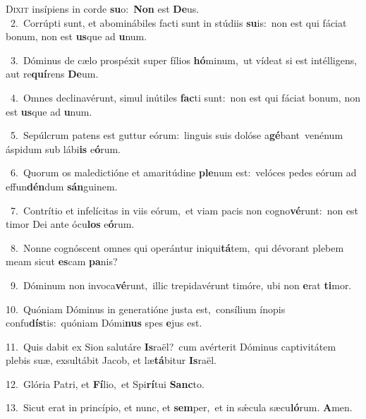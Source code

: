 \lettrine{\initial\textcolor{\initialcolor}{D}}{ixit} insípiens in corde \textbf{su}\-o:~\star \textbf{Non} est \textbf{De}\-us.\\
{\numbfont\textcolor{\numbcolor}{~2.}}~Corrúpti sunt, et abominábiles facti sunt in stúdiis \textbf{su}\-is:~\star non est qui fáciat bonum, non est \textbf{us}\-que ad \textbf{u}\-num.\par
{\numbfont\textcolor{\numbcolor}{~3.}}~Dóminus de cælo prospéxit super fílios \textbf{hó}\-minum,~\star ut vídeat si est intélligens, aut re\-\textbf{quí}\-rens \textbf{De}\-um.\par
{\numbfont\textcolor{\numbcolor}{~4.}}~Omnes declinavérunt, simul inútiles \textbf{fac}\-ti sunt:~\star non est qui fáciat bonum, non est \textbf{us}\-que ad \textbf{u}\-num.\par
{\numbfont\textcolor{\numbcolor}{~5.}}~Sepúlcrum patens est guttur eórum:~\dagger linguis suis dolóse a\-\textbf{gé}\-bant~\star venénum áspidum sub lábi\textbf{is} e\-\textbf{ó}\-rum.\par
{\numbfont\textcolor{\numbcolor}{~6.}}~Quorum os maledictióne et amaritúdine \textbf{ple}\-num est:~\star velóces pedes eórum ad effun\-\textbf{dén}\-dum \textbf{sán}\-guinem.\par
{\numbfont\textcolor{\numbcolor}{~7.}}~Contrítio et infelícitas in viis eórum,~\dagger et viam pacis non cogno\-\textbf{vé}\-runt:~\star non est timor Dei ante ócu\textbf{los} e\-\textbf{ó}\-rum.\par
{\numbfont\textcolor{\numbcolor}{~8.}}~Nonne cognóscent omnes qui operántur iniqui\-\textbf{tá}\-tem,~\star qui dévorant plebem meam sicut \textbf{es}\-cam \textbf{pa}\-nis?\par
{\numbfont\textcolor{\numbcolor}{~9.}}~Dóminum non invoca\-\textbf{vé}\-runt,~\star illic trepidavérunt timóre, ubi non \textbf{e}\-rat \textbf{ti}\-mor.\par
{\numbfont\textcolor{\numbcolor}{10.}}~Quóniam Dóminus in generatióne justa est,~\dagger consílium ínopis confu\-\textbf{dís}\-tis:~\star quóniam Dómi\textbf{nus} spes \textbf{e}\-jus est.\par
{\numbfont\textcolor{\numbcolor}{11.}}~Quis dabit ex Sion salutáre \textbf{Is}\-raël?~\star cum avérterit Dóminus captivitátem plebis suæ, exsultábit Jacob, et læ\-\textbf{tá}\-bitur \textbf{Is}\-raël.\par
{\numbfont\textcolor{\numbcolor}{12.}}~Glória Patri, et \textbf{Fí}\-lio,~\star et Spi\-\textbf{rí}\-tui \textbf{Sanc}\-to.\par
{\numbfont\textcolor{\numbcolor}{13.}}~Sicut erat in princípio, et nunc, et \textbf{sem}\-per,~\star et in sǽcula sæcu\-\textbf{ló}\-rum. \textbf{A}\-men.\par
